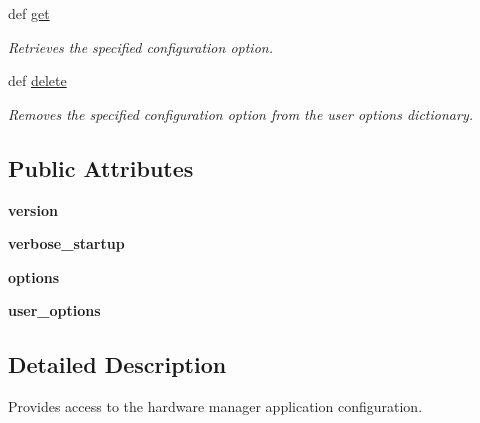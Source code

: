 \begin{DoxyCompactItemize}
def \hyperlink{classhwm_1_1application_1_1core_1_1configuration_1_1_config_ab3b92609e2a697e2c481d81f84773b65}{get}
\begin{DoxyCompactList}\small\item\em Retrieves the specified configuration option. \end{DoxyCompactList}\item 
def \hyperlink{classhwm_1_1application_1_1core_1_1configuration_1_1_config_ac79af23930eb7637318ed74ebeff3702}{delete}
\begin{DoxyCompactList}\small\item\em Removes the specified configuration option from the user options dictionary. \end{DoxyCompactList}\end{DoxyCompactItemize}
\subsection*{Public Attributes}
\begin{DoxyCompactItemize}
\item 
\hypertarget{classhwm_1_1application_1_1core_1_1configuration_1_1_config_a9f0902bd3720a08c55503e873ef024ae}{{\bfseries version}}\label{classhwm_1_1application_1_1core_1_1configuration_1_1_config_a9f0902bd3720a08c55503e873ef024ae}

\item 
\hypertarget{classhwm_1_1application_1_1core_1_1configuration_1_1_config_aff887c3c65575a03d1b4a9bc95446850}{{\bfseries verbose\-\_\-startup}}\label{classhwm_1_1application_1_1core_1_1configuration_1_1_config_aff887c3c65575a03d1b4a9bc95446850}

\item 
\hypertarget{classhwm_1_1application_1_1core_1_1configuration_1_1_config_aa19e046d9fa50f38904a53c699b1e8dd}{{\bfseries options}}\label{classhwm_1_1application_1_1core_1_1configuration_1_1_config_aa19e046d9fa50f38904a53c699b1e8dd}

\item 
\hypertarget{classhwm_1_1application_1_1core_1_1configuration_1_1_config_a45019012f025b26cee82ca5fcd130faa}{{\bfseries user\-\_\-options}}\label{classhwm_1_1application_1_1core_1_1configuration_1_1_config_a45019012f025b26cee82ca5fcd130faa}

\end{DoxyCompactItemize}


\subsection{Detailed Description}
Provides access to the hardware manager application configuration. 

